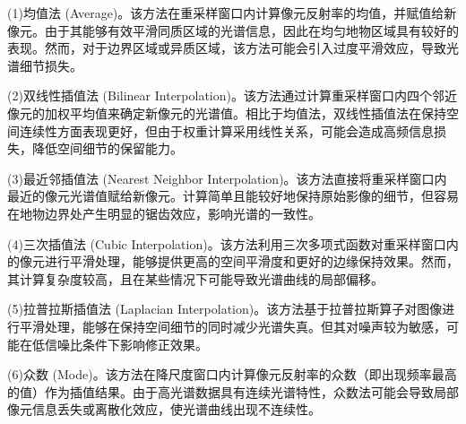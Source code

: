 (1)均值法 (Average)。该方法在重采样窗口内计算像元反射率的均值，并赋值给新像元。由于其能够有效平滑同质区域的光谱信息，因此在均匀地物区域具有较好的表现。然而，对于边界区域或异质区域，该方法可能会引入过度平滑效应，导致光谱细节损失。

(2)双线性插值法 (Bilinear Interpolation)。该方法通过计算重采样窗口内四个邻近像元的加权平均值来确定新像元的光谱值。相比于均值法，双线性插值法在保持空间连续性方面表现更好，但由于权重计算采用线性关系，可能会造成高频信息损失，降低空间细节的保留能力\cite{grevera2002objective}。

(3)最近邻插值法 (Nearest Neighbor Interpolation)。该方法直接将重采样窗口内最近的像元光谱值赋给新像元。计算简单且能较好地保持原始影像的细节，但容易在地物边界处产生明显的锯齿效应，影响光谱的一致性\cite{parker2007comparison,Hanssen1999Evaluation}。

(4)三次插值法 (Cubic Interpolation)。该方法利用三次多项式函数对重采样窗口内的像元进行平滑处理，能够提供更高的空间平滑度和更好的边缘保持效果\cite{keys2003cubic}。然而，其计算复杂度较高，且在某些情况下可能导致光谱曲线的局部偏移。

(5)拉普拉斯插值法 (Laplacian Interpolation)。该方法基于拉普拉斯算子对图像进行平滑处理，能够在保持空间细节的同时减少光谱失真。但其对噪声较为敏感，可能在低信噪比条件下影响修正效果\cite{turkowski1990filters}。

(6)众数 (Mode)。该方法在降尺度窗口内计算像元反射率的众数（即出现频率最高的值）作为插值结果。由于高光谱数据具有连续光谱特性，众数法可能会导致局部像元信息丢失或离散化效应，使光谱曲线出现不连续性。

